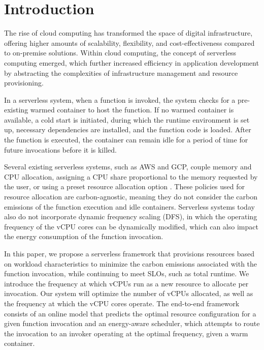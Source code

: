 \documentclass[times, 10pt,twocolumn]{article}
\begin{document}
\section{Introduction}

The rise of cloud computing has transformed the space of digital infrastructure, offering higher amounts of scalability, flexibility, and cost-effectiveness compared to on-premise solutions. Within cloud computing, the concept of serverless computing emerged, which further increased efficiency in application development by abstracting the complexities of infrastructure management and resource provisioning. 

In a serverless system, when a function is invoked, the system checks for a pre-existing warmed container to host the function. If no warmed container is available, a cold start is initiated, during which the runtime environment is set up, necessary dependencies are installed, and the function code is loaded. After the function is executed, the container can remain idle for a period of time for future invocations before it is killed.

Several existing serverless systems, such as AWS and GCP, couple memory and CPU allocation, assigning a CPU share proportional to the memory requested by the user, or using a preset resource allocation option \cite{bibal2023acm}. These policies used for resource allocation are carbon-agnostic, meaning they do not consider the carbon emissions of the function execution and idle containers. Serverless systems today also do not incorporate dynamic frequency scaling (DFS), in which the operating frequency of the vCPU cores can be dynamically modified, which can also impact the energy consumption of the function invocation.

In this paper, we propose a serverless framework that provisions resources based on workload characteristics to minimize the carbon emissions associated with the function invocation, while continuing to meet SLOs, such as total runtime. We introduce the frequency at which vCPUs run as a new resource to allocate per invocation. Our system will optimize the number of vCPUs allocated, as well as the frequency at which the vCPU cores operate. The end-to-end framework consists of an online model that predicts the optimal resource configuration for a given function invocation and an energy-aware scheduler, which attempts to route the invocation to an invoker operating at the optimal frequency, given a warm container. 
\end{document}
